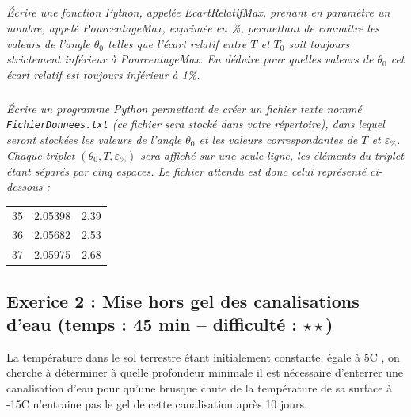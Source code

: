 \documentclass[10pt,oneside]{article}
\begin{document}
\subparagraph{}
\textit{Écrire une fonction Python, appelée \textsf{EcartRelatifMax}, prenant en paramètre un nombre, appelé
\textsf{PourcentageMax}, exprimée en \%, permettant de connaitre les valeurs de l’angle $\theta_0$ telles que l’écart relatif entre $T$ et $T_0$ soit toujours strictement inférieur à \textsf{PourcentageMax}. En déduire pour quelles valeurs de $\theta_0$ cet écart relatif est toujours inférieur à 1\%.}

\subparagraph{\label{q9}}
\textit{Écrire un programme Python permettant de créer un fichier texte nommé \texttt{FichierDonnees.txt} (ce fichier sera stocké dans votre répertoire), dans lequel seront stockées les valeurs de l’angle $\theta_0$  et les valeurs correspondantes de $T$ et $\varepsilon_{\%}$. Chaque triplet $(\theta_0,T,\varepsilon_{\%})$ sera affiché sur une seule ligne, les
éléments du triplet étant séparés par cinq espaces. Le fichier attendu est donc celui représenté ci-dessous
:}

\begin{tabular}{lll}
35& 2.05398 &2.39\\
36 &2.05682 &2.53\\
37 &2.05975 &2.68
\end{tabular}

\subsection*{Exerice 2 : Mise hors gel des canalisations d'eau (temps : 45 min – difficulté : $\star\star $)}

La température dans le sol terrestre étant initialement constante, égale à 5\textdegree C , on cherche à déterminer
à quelle profondeur minimale il est nécessaire d’enterrer une canalisation d’eau pour qu’une brusque
chute de la température de sa surface à -15\textdegree C n’entraine pas le gel de cette canalisation après 10 jours.
\end{document}
